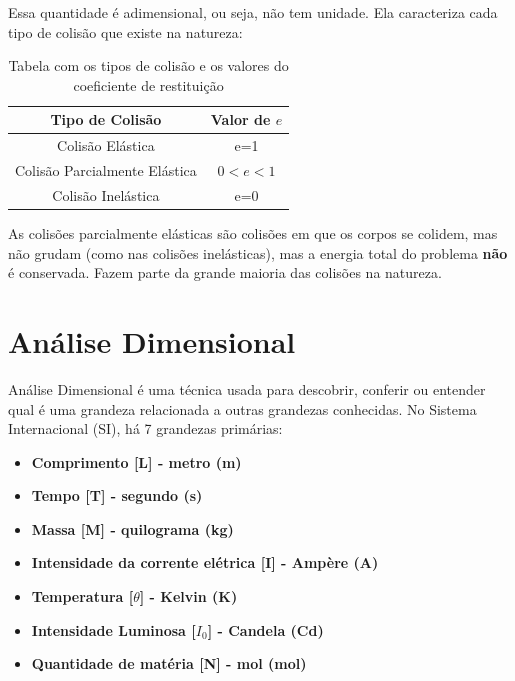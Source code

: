 \documentclass[12pt]{extarticle}
\newcommand{\<}{\langle}
\renewcommand{\>}{\rangle}
\theoremstyle{definition}
\begin{document}
Essa quantidade é adimensional, ou seja, não tem unidade. Ela caracteriza cada tipo de colisão que existe na natureza:
\begin{table}[H]
    \centering
    \begin{tabular}{|c|c|}
    \hline
         \textbf{Tipo de Colisão} & \textbf{Valor de $e$}   \\
         \hline 
         Colisão Elástica & e=1\\
         \hline
         Colisão Parcialmente Elástica & $0<e<1$\\
         \hline
         Colisão Inelástica & e=0\\
         \hline
    \end{tabular}
    \caption{Tabela com os tipos de colisão e os valores do coeficiente de restituição}
    \label{tab:coef_restituicao}
\end{table}

As colisões parcialmente elásticas são colisões em que os corpos se colidem, mas não grudam (como nas colisões inelásticas), mas a energia total do problema \textbf{não} é conservada. Fazem parte da grande maioria das colisões na natureza.

\section{Análise Dimensional}

Análise Dimensional é uma técnica usada para descobrir, conferir ou entender qual é uma grandeza relacionada a outras grandezas conhecidas. No Sistema Internacional (SI), há 7 grandezas primárias:
\begin{itemize}
    \item \textbf{Comprimento [L] - metro (m)} 
    \item \textbf{Tempo [T] - segundo (s)}
    \item \textbf{Massa [M] - quilograma (kg)}
    \item \textbf{Intensidade da corrente elétrica [I] - Ampère (A)}
    \item \textbf{Temperatura [$\theta$] - Kelvin (K)}
    \item \textbf{Intensidade Luminosa [$I_0$] - Candela (Cd)}
    \item \textbf{Quantidade de matéria [N] - mol (mol)}
\end{itemize}
\end{document}

